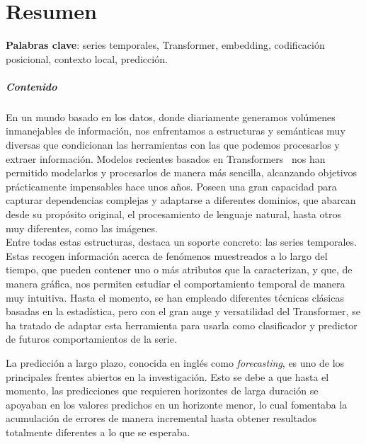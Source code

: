 %

\chapter{Resumen}

\textbf{Palabras clave}: series temporales, Transformer, embedding, codificación posicional, contexto local, predicción.

\vspace{1em}
\paragraph{Contenido}

En un mundo basado en los datos, donde diariamente generamos volúmenes inmanejables de información, nos enfrentamos a estructuras y semánticas muy diversas que condicionan las herramientas con las que podemos procesarlos y extraer información. Modelos recientes basados en Transformers~\cite{vaswani2023attentionneed} nos han permitido modelarlos y procesarlos de manera más sencilla, alcanzando objetivos prácticamente impensables hace unos años. Poseen una gran capacidad para capturar dependencias complejas y adaptarse a diferentes dominios, que abarcan desde su propósito original, el procesamiento de lenguaje natural, hasta otros muy diferentes, como las imágenes.\\
Entre todas estas estructuras, destaca un soporte concreto: las series temporales. Estas recogen información acerca de fenómenos muestreados a lo largo del tiempo, que pueden contener uno o más atributos que la caracterizan, y que, de manera gráfica, nos permiten estudiar el comportamiento temporal de manera muy intuitiva. Hasta el momento, se han empleado diferentes técnicas clásicas basadas en la estadística, pero con el gran auge y versatilidad del Transformer, se ha tratado de adaptar esta herramienta para usarla como clasificador y predictor de futuros comportamientos de la serie.\vspace{0.35em}

La predicción a largo plazo, conocida en inglés como \textit{forecasting}, es uno de los principales frentes abiertos en la investigación. Esto se debe a que hasta el momento, las predicciones que requieren horizontes de larga duración se apoyaban en los valores predichos en un horizonte menor, lo cual fomentaba la acumulación de errores de manera incremental hasta obtener resultados totalmente diferentes a lo que se esperaba. \vspace{0.35em}

